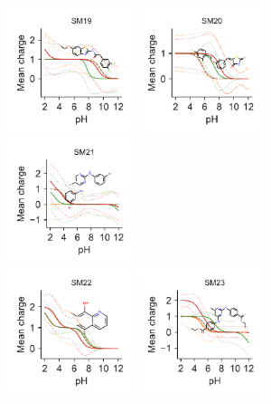 \documentclass[9pt,lineno,final]{elife}
\begin{document}
 \begin{figure}[H]	
	\centering
	\includegraphics[width=0.33\textwidth]{Reports/SM19-titrationcurve-views.pdf}
	\includegraphics[width=0.33\textwidth]{Reports/SM20-titrationcurve-views.pdf}
	\includegraphics[width=0.33\textwidth]{Reports/SM21-titrationcurve-views.pdf}	 \\
	\includegraphics[width=0.33\textwidth]{Reports/SM22-titrationcurve-views.pdf}
	\includegraphics[width=0.33\textwidth]{Reports/SM23-titrationcurve-views.pdf}

\end{figure}
\end{document}
